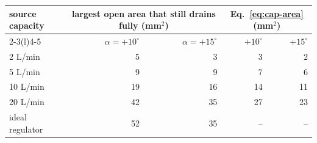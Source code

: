 \begin{tabular}{@{}l r r r r@{}}
\toprule
source capacity & \multicolumn{2}{c}{largest open area that still drains fully (mm$^2$)} & \multicolumn{2}{c}{Eq.~\eqref{eq:cap-area} (mm$^2$)} \\
\cmidrule(lr){2-3}\cmidrule(l){4-5}
 & $\alpha=+10^\circ$ & $\alpha=+15^\circ$ & $+10^\circ$ & $+15^\circ$ \\
\midrule
2 L/min & 5 & 3 & 3 & 2 \\
5 L/min & 9 & 9 & 7 & 6 \\
10 L/min & 19 & 16 & 14 & 11 \\
20 L/min & 42 & 35 & 27 & 23 \\
ideal regulator & 52 & 35 & -- & -- \\
\bottomrule
\end{tabular}

